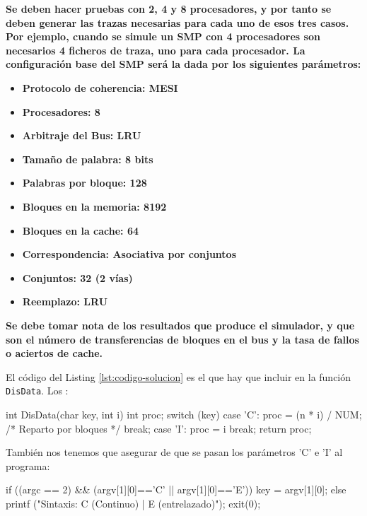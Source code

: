 \begin{itemize}
    \textbf{Se deben hacer pruebas con 2, 4 y 8 procesadores, y por tanto se deben generar las trazas necesarias para cada uno de esos tres casos. Por ejemplo, cuando se simule un SMP con 4 procesadores son necesarios 4 ficheros de traza, uno para cada procesador. La configuración base del SMP será la dada por los siguientes parámetros:}

    \begin{itemize}
        \item \textbf{Protocolo de coherencia: MESI}
        \item \textbf{Procesadores: 8}
        \item \textbf{Arbitraje del Bus: LRU}
        \item \textbf{Tamaño de palabra: 8 bits}
        \item \textbf{Palabras por bloque: 128}
        \item \textbf{Bloques en la memoria: 8192}
        \item \textbf{Bloques en la cache: 64}
        \item \textbf{Correspondencia: Asociativa por conjuntos}
        \item \textbf{Conjuntos: 32 (2 vías)}
        \item \textbf{Reemplazo: LRU}
    \end{itemize}

    \textbf{Se debe tomar nota de los resultados que produce el simulador, y que son el número de transferencias de bloques en el bus y la tasa de fallos o aciertos de cache.}

    El código del Listing \ref{lst:codigo-solucion} es el que hay que incluir en la función \verb|DisData|. Los :

\begin{mycode}[style=cstyle, caption={Funcion para repartir los datos entre los procesadores.}, label=lst:codigo-solucion]
int DisData(char key, int i) {
    int proc;
    switch (key) {
        case 'C': 
            proc = (n * i) / NUM; /* Reparto por bloques */
            break;
        case 'I': 
            proc = i %
            break;
    }
    return proc;
}
\end{mycode}

    También nos tenemos que asegurar de que se pasan los parámetros 'C' e 'I' al programa:

    \begin{mycode}[style=cstyle, caption={Comprobación de los parámetros del programa.}, label=lst:codigo-solucion2]
if ((argc == 2) && (argv[1][0]=='C' || argv[1][0]=='E')) {
	key = argv[1][0];
} else { 
	printf ("Sintaxis: C (Continuo) | E (entrelazado)\n");
	exit(0);
}
  \end{mycode}
	



\end{itemize}
